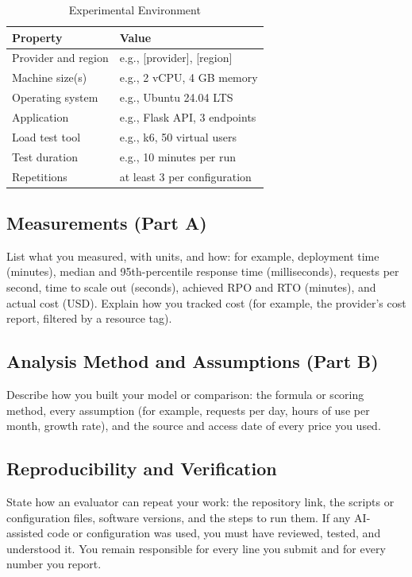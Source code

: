 \documentclass[conference,a4paper]{IEEEtran}
\begin{document}
	\begin{table}[htbp]
		\caption{Experimental Environment}
		\begin{center}
			\footnotesize
			\begin{tabular}{|l|l|}
				\hline
				\textbf{Property} & \textbf{Value} \\
				\hline
				Provider and region & e.g., [provider], [region] \\
				\hline
				Machine size(s) & e.g., 2 vCPU, 4 GB memory \\
				\hline
				Operating system & e.g., Ubuntu 24.04 LTS \\
				\hline
				Application & e.g., Flask API, 3 endpoints \\
				\hline
				Load test tool & e.g., k6, 50 virtual users \\
				\hline
				Test duration & e.g., 10 minutes per run \\
				\hline
				Repetitions & at least 3 per configuration \\
				\hline
			\end{tabular}
			\label{tab:environment}
		\end{center}
	\end{table}
	
	\subsection{Measurements (Part A)}
	List what you measured, with units, and how: for example, deployment time (minutes), median and 95th-percentile response time (milliseconds), requests per second, time to scale out (seconds), achieved RPO and RTO (minutes), and actual cost (USD). Explain how you tracked cost (for example, the provider's cost report, filtered by a resource tag).
	
	\subsection{Analysis Method and Assumptions (Part B)}
	Describe how you built your model or comparison: the formula or scoring method, every assumption (for example, requests per day, hours of use per month, growth rate), and the source and access date of every price you used.
	
	\subsection{Reproducibility and Verification}
	State how an evaluator can repeat your work: the repository link, the scripts or configuration files, software versions, and the steps to run them. If any AI-assisted code or configuration was used, you must have reviewed, tested, and understood it. You remain responsible for every line you submit and for every number you report.
	
\end{document}
